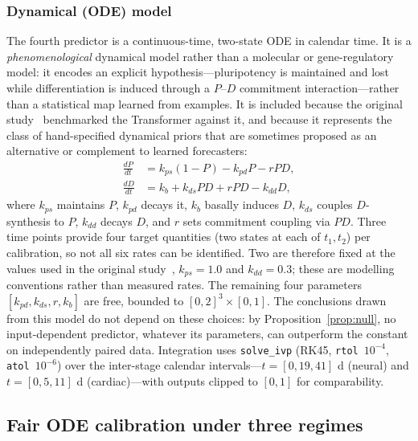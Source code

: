 \documentclass[10pt,letterpaper]{article}
\begin{document}
\subsubsection*{Dynamical (ODE) model}
The fourth predictor is a continuous-time, two-state ODE in calendar time. It is a \emph{phenomenological} dynamical model rather than a molecular or gene-regulatory model: it encodes an explicit hypothesis---pluripotency is maintained and lost while differentiation is induced through a $P$--$D$ commitment interaction---rather than a statistical map learned from examples. It is included because the original study~\cite{kanu2026transformer} benchmarked the Transformer against it, and because it represents the class of hand-specified dynamical priors that are sometimes proposed as an alternative or complement to learned forecasters:
\begin{align}
\frac{dP}{dt} &= k_{ps}(1-P) - k_{pd}P - rPD,
\label{eq:ode_p}\\
\frac{dD}{dt} &= k_b + k_{ds}PD + rPD - k_{dd}D,
\label{eq:ode_d}
\end{align}
where $k_{ps}$ maintains $P$, $k_{pd}$ decays it, $k_b$ basally induces $D$, $k_{ds}$ couples $D$-synthesis to $P$, $k_{dd}$ decays $D$, and $r$ sets commitment coupling via $PD$. Three time points provide four target quantities (two states at each of $t_1,t_2$) per calibration, so not all six rates can be identified. Two are therefore fixed at the values used in the original study~\cite{kanu2026transformer}, $k_{ps}{=}1.0$ and $k_{dd}{=}0.3$; these are modelling conventions rather than measured rates. The remaining four parameters $[k_{pd},k_{ds},r,k_b]$ are free, bounded to $[0,2]^3\times[0,1]$. The conclusions drawn from this model do not depend on these choices: by Proposition~\ref{prop:null}, no input-dependent predictor, whatever its parameters, can outperform the constant on independently paired data. Integration uses \texttt{solve\_ivp} (RK45, \texttt{rtol}~$10^{-4}$, \texttt{atol}~$10^{-6}$) over the inter-stage calendar intervals---$t=[0,19,41]$ d (neural) and $t=[0,5,11]$ d (cardiac)---with outputs clipped to $[0,1]$ for comparability.

\subsection*{Fair ODE calibration under three regimes}
\label{subsec:ode_calib}
\end{document}
